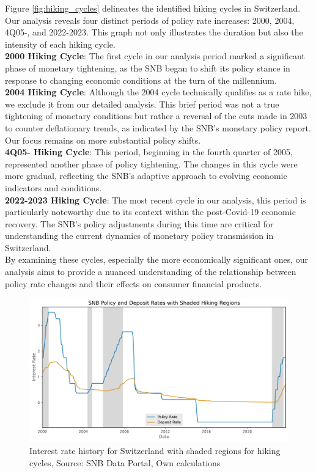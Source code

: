 \documentclass{article}
\begin{document}
Figure \ref{fig:hiking_cycles} delineates the identified hiking cycles in Switzerland. Our analysis reveals four distinct periods of policy rate increases: 2000, 2004, 4Q05-, and 2022-2023. This graph not only illustrates the duration but also the intensity of each hiking cycle.\\

\textbf{2000 Hiking Cycle}: The first cycle in our analysis period marked a significant phase of monetary tightening, as the SNB began to shift its policy stance in response to changing economic conditions at the turn of the millennium.\\

\textbf{2004 Hiking Cycle}: Although the 2004 cycle technically qualifies as a rate hike, we exclude it from our detailed analysis. This brief period was not a true tightening of monetary conditions but rather a reversal of the cuts made in 2003 to counter deflationary trends, as indicated by the SNB's monetary policy report\cite{snb2004monetary}. Our focus remains on more substantial policy shifts.\\

\textbf{4Q05- Hiking Cycle}: This period, beginning in the fourth quarter of 2005, represented another phase of policy tightening. The changes in this cycle were more gradual, reflecting the SNB's adaptive approach to evolving economic indicators and conditions.\\

\textbf{2022-2023 Hiking Cycle}: The most recent cycle in our analysis, this period is particularly noteworthy due to its context within the post-Covid-19 economic recovery. The SNB's policy adjustments during this time are critical for understanding the current dynamics of monetary policy transmission in Switzerland.\\

By examining these cycles, especially the more economically significant ones, our analysis aims to provide a nuanced understanding of the relationship between policy rate changes and their effects on consumer financial products.\\

\begin{figure}[h!]
    \centering
    \includegraphics[width=1\textwidth]{../../figures/rates_shaded_SNB.pdf}
    \caption{Interest rate history for Switzerland with shaded regions for hiking cycles, Source: SNB Data Portal\cite{snb2023}, Own calculations}
    \label{fig:rates_shaded}
\end{figure}
\end{document}
